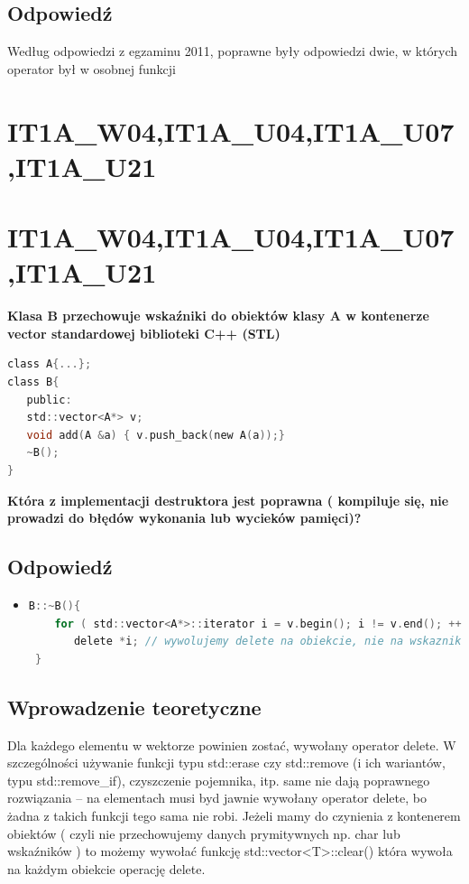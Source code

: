 \subsection{Odpowiedź}
Według odpowiedzi z egzaminu 2011, poprawne były odpowiedzi dwie, w których operator był w osobnej funkcji

\section{IT1A\_W04,IT1A\_U04,IT1A\_U07,IT1A\_U21} 

\section{IT1A\_W04,IT1A\_U04,IT1A\_U07,IT1A\_U21} 
\textbf{Klasa B przechowuje wskaźniki do obiektów klasy A w kontenerze vector standardowej biblioteki C++ (STL)}
\begin{lstlisting}[language=c]
class A{...};
class B{
   public:
   std::vector<A*> v;
   void add(A &a) { v.push_back(new A(a));}
   ~B();
}
\end{lstlisting}
\textbf{Która z implementacji destruktora jest poprawna ( kompiluje się, nie prowadzi do błędów wykonania lub wycieków pamięci)?}

\subsection{Odpowiedź}
\begin{itemize}
\item 
\begin{lstlisting}[language=c]
 B::~B(){
    for ( std::vector<A*>::iterator i = v.begin(); i != v.end(); ++i )
       delete *i; // wywolujemy delete na obiekcie, nie na wskazniku do niego!
 }
\end{lstlisting}
\end{itemize}

\subsection{Wprowadzenie teoretyczne}
Dla każdego elementu w wektorze powinien zostać, wywołany operator delete. W szczególności używanie funkcji typu std::erase czy std::remove (i ich wariantów, typu std::remove\_if), czyszczenie pojemnika, itp. same nie dają poprawnego rozwiązania – na elementach musi byd jawnie wywołany operator delete, bo żadna z takich funkcji tego sama nie robi. Jeżeli mamy do czynienia z kontenerem obiektów ( czyli nie przechowujemy danych prymitywnych np. char lub wskaźników ) to możemy wywołać funkcję std::vector<T>::clear() która wywoła na każdym obiekcie operację delete.

